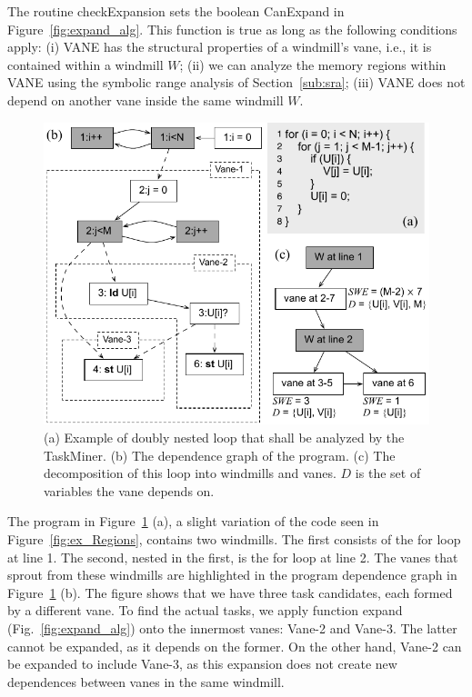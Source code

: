 \documentclass[sigplan,10pt,screen]{acmart}
\newcommand\Taskminer{\mbox{\textsf{TaskMiner}}}
\begin{document}
The routine \textsf{checkExpansion} sets the boolean \textsf{CanExpand} in
Figure~\ref{fig:expand_alg}.
This function is true as long as the following conditions apply:
(i) \textsf{VANE} has the structural properties of a
windmill's vane, i.e., it is contained within a windmill $W$;
(ii) we can analyze the memory regions within \textsf{VANE} using the
symbolic range analysis of Section~\ref{sub:sra};
(iii) \textsf{VANE} does not depend on another vane inside the same windmill $W$.

\begin{figure}[h]
\begin{center}
\includegraphics[width=1\columnwidth]{images/ex_expansion}
\caption{(a) Example of doubly nested loop that shall be analyzed by the 
\Taskminer.
(b) The dependence graph of the program.
(c) The decomposition of this loop into windmills and vanes.
$D$ is the set of variables the vane depends on.}
\label{fig:ex_expansion}
\end{center}
\end{figure}

The program in Figure~\ref{fig:ex_expansion} (a), a slight variation of
the code seen in Figure~\ref{fig:ex_Regions}, contains two windmills.
The first consists of the \textsf{for} loop at line 1.
The second, nested in the first, is the \textsf{for} loop at line 2.
The vanes that sprout from these windmills are highlighted in the program
dependence graph in Figure~\ref{fig:ex_expansion} (b).
The figure shows that we have three task candidates, each formed by a
different vane.
To find the actual tasks, we apply function \textsf{expand}
(Fig.~\ref{fig:expand_alg}) onto the innermost vanes: \textsf{Vane-2} and
\textsf{Vane-3}.
The latter cannot be expanded, as it depends on the former.
On the other hand, \textsf{Vane-2} can be expanded to include
\textsf{Vane-3}, as this expansion does not create new dependences between vanes
in the same windmill.
\end{document}
